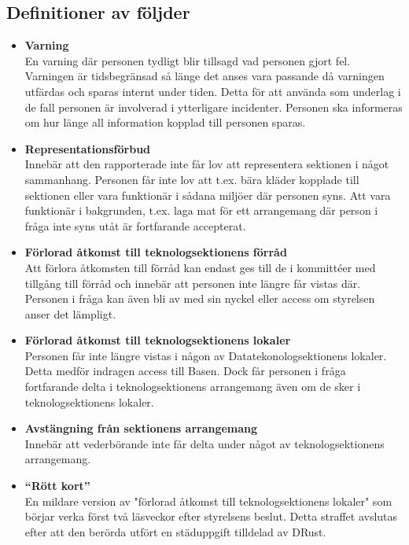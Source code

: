 \documentclass[a4paper]{dtek}
\begin{document}
\subsection{Definitioner av följder}
\begin{itemize}
    \item \textbf{Varning}\\
    En varning där personen tydligt blir tillsagd vad personen gjort fel. Varningen är tidsbegränsad så länge det anses vara passande då varningen utfärdas och sparas internt under tiden. Detta för att använda som underlag i de fall personen är involverad i ytterligare incidenter. Personen ska informeras om hur länge all information kopplad till personen sparas. 

    \item \textbf{Representationsförbud}\\
    Innebär att den rapporterade inte får lov att representera sektionen i något sammanhang. Personen får inte lov att t.ex. bära kläder kopplade till sektionen eller vara funktionär i sådana miljöer där personen syns. Att vara funktionär i bakgrunden, t.ex. laga mat för ett arrangemang där person i fråga inte syns utåt är fortfarande accepterat.
    \item \textbf{Förlorad åtkomst till teknologsektionens förråd}\\
    Att förlora åtkomsten till förråd kan endast ges till de i kommittéer med tillgång till förråd och innebär att personen inte längre får vistas där. Personen i fråga kan även bli av med sin nyckel eller access om styrelsen anser det lämpligt.
    \item \textbf{Förlorad åtkomst till teknologsektionens lokaler}\\
    Personen får inte längre vistas i någon av Datatekonologsektionens lokaler. Detta medför indragen access till Basen. Dock får personen i fråga fortfarande delta i teknologsektionens arrangemang även om de sker i teknologsektionens lokaler. 
    \item \textbf{Avstängning från sektionens arrangemang}\\
    Innebär att vederbörande inte får delta under något av teknologsektionens arrangemang.
    \item \textbf{``Rött kort''}\\
    En mildare version av "förlorad åtkomst till teknologsektionens lokaler" som börjar verka först två läsveckor efter styrelsens beslut. Detta straffet avslutas efter att den berörda utfört en städuppgift tilldelad av DRust.
\end{itemize}
\end{document}
